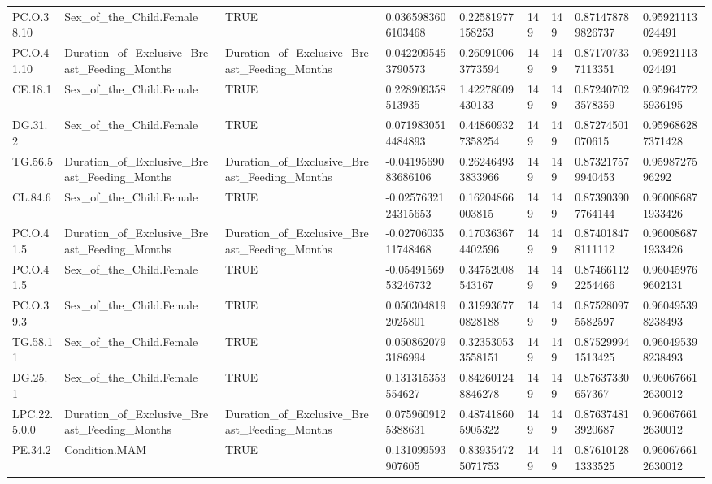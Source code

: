 \begin{longtable}{lllllllll}
PC.O.38.10 & Sex\_of\_the\_Child.Female & TRUE & 0.0365983606103468 & 0.22581977158253 & 149 & 149 & 0.871478789826737 & 0.95921113024491 \\
PC.O.41.10 & Duration\_of\_Exclusive\_Breast\_Feeding\_Months & Duration\_of\_Exclusive\_Breast\_Feeding\_Months & 0.0422095453790573 & 0.260910063773594 & 149 & 149 & 0.871707337113351 & 0.95921113024491 \\
CE.18.1 & Sex\_of\_the\_Child.Female & TRUE & 0.228909358513935 & 1.42278609430133 & 149 & 149 & 0.872407023578359 & 0.959647725936195 \\
DG.31.2 & Sex\_of\_the\_Child.Female & TRUE & 0.0719830514484893 & 0.448609327358254 & 149 & 149 & 0.87274501070615 & 0.959686287371428 \\
TG.56.5 & Duration\_of\_Exclusive\_Breast\_Feeding\_Months & Duration\_of\_Exclusive\_Breast\_Feeding\_Months & -0.0419569083686106 & 0.262464933833966 & 149 & 149 & 0.873217579940453 & 0.9598727596292 \\
CL.84.6 & Sex\_of\_the\_Child.Female & TRUE & -0.0257632124315653 & 0.16204866003815 & 149 & 149 & 0.873903907764144 & 0.960086871933426 \\
PC.O.41.5 & Duration\_of\_Exclusive\_Breast\_Feeding\_Months & Duration\_of\_Exclusive\_Breast\_Feeding\_Months & -0.0270603511748468 & 0.170363674402596 & 149 & 149 & 0.874018478111112 & 0.960086871933426 \\
PC.O.41.5 & Sex\_of\_the\_Child.Female & TRUE & -0.0549156953246732 & 0.34752008543167 & 149 & 149 & 0.874661122254466 & 0.960459769602131 \\
PC.O.39.3 & Sex\_of\_the\_Child.Female & TRUE & 0.0503048192025801 & 0.319936770828188 & 149 & 149 & 0.875280975582597 & 0.960495398238493 \\
TG.58.11 & Sex\_of\_the\_Child.Female & TRUE & 0.0508620793186994 & 0.323530533558151 & 149 & 149 & 0.875299941513425 & 0.960495398238493 \\
DG.25.1 & Sex\_of\_the\_Child.Female & TRUE & 0.131315353554627 & 0.842601248846278 & 149 & 149 & 0.87637330657367 & 0.960676612630012 \\
LPC.22.5.0.0 & Duration\_of\_Exclusive\_Breast\_Feeding\_Months & Duration\_of\_Exclusive\_Breast\_Feeding\_Months & 0.0759609125388631 & 0.487418605905322 & 149 & 149 & 0.876374813920687 & 0.960676612630012 \\
PE.34.2 & Condition.MAM & TRUE & 0.131099593907605 & 0.839354725071753 & 149 & 149 & 0.876101281333525 & 0.960676612630012 \\

\end{longtable}
